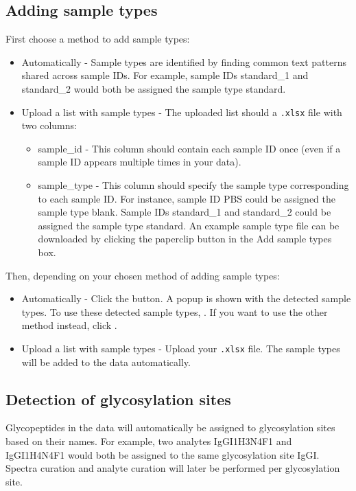 \newpage
\subsection{Adding sample types}
First choose a method to add sample types:
\begin{itemize}[topsep=0pt, itemsep=0pt]
	\item
	\textsf{Automatically} - Sample types are identified by finding common text patterns shared across sample IDs.
	For example, sample IDs \textsf{standard\_1} and \textsf{standard\_2} would both be assigned the sample type \textsf{standard}.
	\item 
	\textsf{Upload a list with sample types} - The uploaded list should a \texttt{.xlsx} file with two columns:
	\begin{itemize}[topsep=0pt, itemsep=0pt]
		\item 
		\textsf{sample\_id} - This column should contain each sample ID once (even if a sample ID appears multiple times in your data).
		\item 
		\textsf{sample\_type} - This column should specify the sample type corresponding to each sample ID.
		For instance, sample ID \textsf{PBS} could be assigned the sample type \textsf{blank}.
		Sample IDs \textsf{standard\_1} and \textsf{standard\_2} could be assigned the sample type \textsf{standard}.
		An example sample type file can be downloaded by clicking the paperclip button in the \textsf{Add sample types} box.
	\end{itemize}
\end{itemize}

Then, depending on your chosen method of adding sample types:
\begin{itemize}[topsep=0pt, itemsep=0pt]
	\item 
	\textsf{Automatically} - Click the  button.
	A popup is shown with the detected sample types.
	To use these detected sample types, .
	If you want to use the other method instead, click .
	\item 
	\textsf{Upload a list with sample types} - Upload your \texttt{.xlsx} file.
	The sample types will be added to the data automatically.
\end{itemize}


\subsection{Detection of glycosylation sites}
Glycopeptides in the data will automatically be assigned to glycosylation sites based on their names.
For example, two analytes \textsf{IgGI1H3N4F1} and \textsf{IgGI1H4N4F1} would both be assigned to the same glycosylation site \textsf{IgGI}.
Spectra curation and analyte curation will later be performed per glycosylation site.

